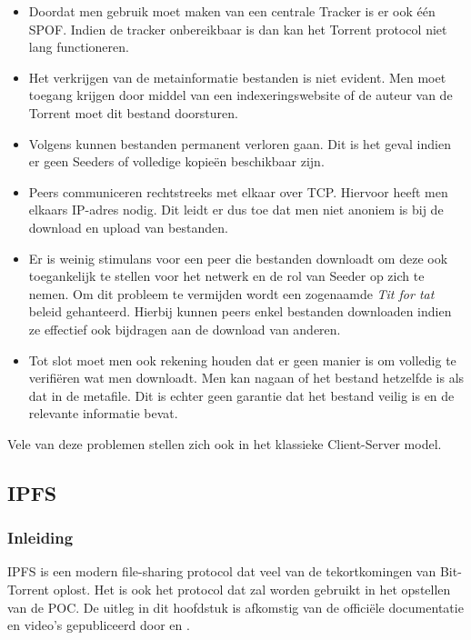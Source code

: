 \begin{itemize}
\item Doordat men gebruik moet maken van een centrale Tracker is er ook één SPOF. Indien de tracker onbereikbaar is dan kan het Torrent protocol niet lang functioneren.\\

\item Het verkrijgen van de metainformatie bestanden is niet evident. Men moet toegang krijgen door middel van een indexeringswebsite of de auteur van de Torrent moet dit bestand doorsturen.\\

\item Volgens \textcite{Thanekar2010} kunnen bestanden permanent verloren gaan. Dit is het geval indien er geen Seeders of volledige kopieën beschikbaar zijn.\\

\item Peers communiceren rechtstreeks met elkaar over TCP. Hiervoor heeft men elkaars IP-adres nodig. Dit leidt er dus toe dat men niet anoniem is bij de download en upload van bestanden.\\

\item Er is weinig stimulans voor een peer die bestanden downloadt om deze ook toegankelijk te stellen voor het netwerk en de rol van Seeder op zich te nemen. Om dit probleem te vermijden wordt een zogenaamde \textit{Tit for tat} beleid gehanteerd. Hierbij kunnen peers enkel bestanden downloaden indien ze effectief ook bijdragen aan de download van anderen.\\

\item Tot slot moet men ook rekening houden dat er geen manier is om volledig te verifiëren wat men downloadt. Men kan nagaan of het bestand hetzelfde is als dat in de metafile. Dit is echter geen garantie dat het bestand veilig is en de relevante informatie bevat. 
\end{itemize}

Vele van deze problemen stellen zich ook in het klassieke Client-Server model.

\subsection{IPFS}
\label{IPFS}
\subsubsection{Inleiding}
IPFS is een modern file-sharing protocol dat veel van de tekortkomingen van Bit-Torrent oplost. Het is ook het protocol dat zal worden gebruikt in het opstellen van de POC. De uitleg in dit hoofdstuk is afkomstig van de officiële documentatie \autocite{IPFSDocs} en video's gepubliceerd door \textcite{Simply2018} en \textcite{IPFS2020}.\\

